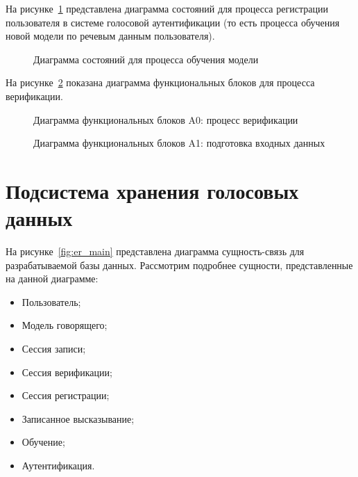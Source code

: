 На рисунке~\ref{fig:fsm_learning} представлена диаграмма состояний для процесса регистрации пользователя в системе голосовой аутентификации (то есть процесса обучения новой модели по речевым данным пользователя).

\begin{figure}
    \caption{Диаграмма состояний для процесса обучения модели}
    \label{fig:fsm_learning}
\end{figure}

На рисунке~\ref{fig:idef0_main} показана диаграмма функциональных блоков для процесса верификации.

\begin{figure}
    \caption{Диаграмма функциональных блоков A0: процесс верификации}
    \label{fig:idef0_main}
\end{figure}

\begin{figure}
    \caption{Диаграмма функциональных блоков A1: подготовка входных данных}
    \label{fig:idef0_pre}
\end{figure}

\section{Подсистема хранения голосовых данных}

На рисунке~\ref{fig:er_main} представлена диаграмма сущность-связь для разрабатываемой базы данных. Рассмотрим подробнее сущности, представленные на данной диаграмме:

\begin{itemize}
\item Пользователь;
\item Модель говорящего;
\item Сессия записи;
\item Сессия верификации;
\item Сессия регистрации;
\item Записанное высказывание;
\item Обучение;
\item Аутентификация.
\end{itemize}

